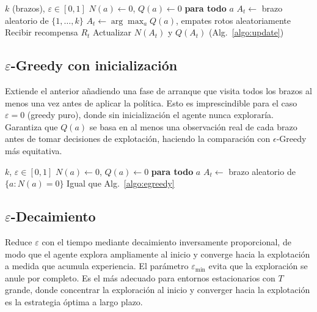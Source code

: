 \begin{algorithm}
\caption{$\varepsilon$-Greedy}\label{algo:egreedy}
\begin{algorithmic}[1]
\Require $k$ (brazos), $\varepsilon \in [0,1]$
\State $N(a) \gets 0$, $Q(a) \gets 0$ \textbf{para todo} $a$
        \State $A_t \gets$ brazo aleatorio de $\{1,\dots,k\}$ 
    \Else
        \State $A_t \gets \arg\max_a Q(a)$, empates rotos aleatoriamente 
    \EndIf
    \State Recibir recompensa $R_t$
    \State Actualizar $N(A_t)$ y $Q(A_t)$ (Alg.~\ref{algo:update})
\EndFor
\end{algorithmic}
\end{algorithm}

\subsection*{$\varepsilon$-Greedy con inicialización}

Extiende el anterior añadiendo una fase de arranque que visita todos los brazos al menos una vez antes de aplicar la política. Esto es imprescindible para el caso $\varepsilon=0$ (greedy puro), donde sin inicialización el agente nunca exploraría. Garantiza que $Q(a)$ se basa en al menos una observación real de cada brazo antes de tomar decisiones de explotación, haciendo la comparación con $\epsilon$-Greedy más equitativa.

\begin{algorithm}
\caption{$\varepsilon$-Greedy con inicialización}\label{algo:egreedy_init}
\begin{algorithmic}[1]
\Require $k$, $\varepsilon \in [0,1]$
\State $N(a) \gets 0$, $Q(a) \gets 0$ \textbf{para todo} $a$
        \State $A_t \gets$ brazo aleatorio de $\{a : N(a) = 0\}$ 
    \EndIf
    \State Igual que Alg.~\ref{algo:egreedy}
\EndFor
\end{algorithmic}
\end{algorithm}

\subsection*{$\varepsilon$-Decaimiento}

Reduce $\varepsilon$ con el tiempo mediante decaimiento inversamente proporcional, de modo que el agente explora ampliamente al inicio y converge hacia la explotación a medida que acumula experiencia. El parámetro $\varepsilon_{\min}$ evita que la exploración se anule por completo. Es el más adecuado para entornos estacionarios con $T$ grande, donde concentrar la exploración al inicio y converger hacia la explotación es la estrategia óptima a largo plazo.


